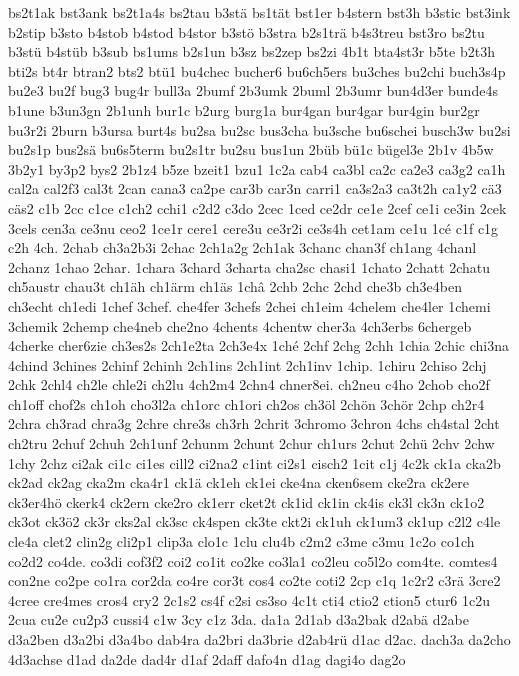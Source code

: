 {bs2t1ak
bst3ank
bs2t1a4s
bs2tau
b3stä
bs1tät
bst1er
b4stern
bst3h
b3stic
bst3ink
b2stip
b3sto
b4stob
b4stod
b4stor
b3stö
b3stra
b2s1trä
b4s3treu
bst3ro
bs2tu
b3stü
b4stüb
b3sub
bs1ums
b2s1un
b3sz
bs2zep
bs2zi
4b1t
bta4st3r
b5te
b2t3h
bti2s
bt4r
btran2
bts2
btü1
bu4chec
bucher6
bu6ch5ers
bu3ches
bu2chi
buch3s4p
bu2e3
bu2f
bug3
bug4r
bull3a
2bumf
2b3umk
2buml
2b3umr
bun4d3er
bunde4s
b1une
b3un3gn
2b1unh
bur1c
b2urg
burg1a
bur4gan
bur4gar
bur4gin
bur2gr
bu3r2i
2burn
b3ursa
burt4s
bu2sa
bu2sc
bus3cha
bu3sche
bu6schei
busch3w
bu2si
bu2s1p
bus2sä
bu6s5term
bu2s1tr
bu2su
bus1un
2büb
bü1c
bügel3e
2b1v
4b5w
3b2y1
by3p2
bys2
2b1z4
b5ze
bzeit1
bzu1
1c2a
cab4
ca3bl
ca2c
ca2e3
ca3g2
ca1h
cal2a
cal2f3
cal3t
2can
cana3
ca2pe
car3b
car3n
carri1
ca3s2a3
ca3t2h
ca1y2
cä3
cäs2
c1b
2cc
c1ce
c1ch2
cchi1
c2d2
c3do
2cec
1ced
ce2dr
ce1e
2cef
ce1i
ce3in
2cek
3cels
cen3a
ce3nu
ceo2
1ce1r
cere1
cere3u
ce3r2i
ce3s4h
cet1am
ce1u
1cé
c1f
c1g
c2h
4ch.
2chab
ch3a2b3i
2chac
2ch1a2g
2ch1ak
3chanc
chan3f
ch1ang
4chanl
2chanz
1chao
2char.
1chara
3chard
3charta
cha2sc
chasi1
1chato
2chatt
2chatu
ch5austr
chau3t
ch1äh
ch1ärm
ch1äs
1châ
2chb
2chc
2chd
che3b
ch3e4ben
ch3echt
ch1edi
1chef
3chef.
che4fer
3chefs
2chei
ch1eim
4chelem
che4ler
1chemi
3chemik
2chemp
che4neb
che2no
4chents
4chentw
cher3a
4ch3erbs
6chergeb
4cherke
cher6zie
ch3es2s
2ch1e2ta
2ch3e4x
1ché
2chf
2chg
2chh
1chia
2chic
chi3na
4chind
3chines
2chinf
2chinh
2ch1ins
2ch1int
2ch1inv
1chip.
1chiru
2chiso
2chj
2chk
2chl4
ch2le
chle2i
ch2lu
4ch2m4
2chn4
chner8ei.
ch2neu
c4ho
2chob
cho2f
ch1off
chof2s
ch1oh
cho3l2a
ch1orc
ch1ori
ch2os
ch3öl
2chön
3chör
2chp
ch2r4
2chra
ch3rad
chra3g
2chre
chre3s
ch3rh
2chrit
3chromo
3chron
4chs
ch4stal
2cht
ch2tru
2chuf
2chuh
2ch1unf
2chunm
2chunt
2chur
ch1urs
2chut
2chü
2chv
2chw
1chy
2chz
ci2ak
ci1c
ci1es
cill2
ci2na2
c1int
ci2s1
cisch2
1cit
c1j
4c2k
ck1a
cka2b
ck2ad
ck2ag
cka2m
cka4r1
ck1ä
ck1eh
ck1ei
cke4na
cken6sem
cke2ra
ck2ere
ck3er4hö
ckerk4
ck2ern
cke2ro
ck1err
cket2t
ck1id
ck1in
ck4is
ck3l
ck3n
ck1o2
ck3ot
ck3ö2
ck3r
cks2al
ck3sc
ck4spen
ck3te
ckt2i
ck1uh
ck1um3
ck1up
c2l2
c4le
cle4a
clet2
clin2g
cli2p1
clip3a
clo1c
1clu
clu4b
c2m2
c3me
c3mu
1c2o
co1ch
co2d2
co4de.
co3di
cof3f2
coi2
co1it
co2ke
co3la1
co2leu
co5l2o
com4te.
comtes4
con2ne
co2pe
co1ra
cor2da
co4re
cor3t
cos4
co2te
coti2
2cp
c1q
1c2r2
c3rä
3cre2
4cree
cre4mes
cros4
cry2
2c1s2
cs4f
c2si
cs3so
4c1t
cti4
ctio2
ction5
ctur6
1c2u
2cua
cu2e
cu2p3
cussi4
c1w
3cy
c1z
3da.
da1a
2d1ab
d3a2bak
d2abä
d2abe
d3a2ben
d3a2bi
d3a4bo
dab4ra
da2bri
da3brie
d2ab4rü
d1ac
d2ac.
dach3a
da2cho
4d3achse
d1ad
da2de
dad4r
d1af
2daff
dafo4n
d1ag
dagi4o
dag2o
}
